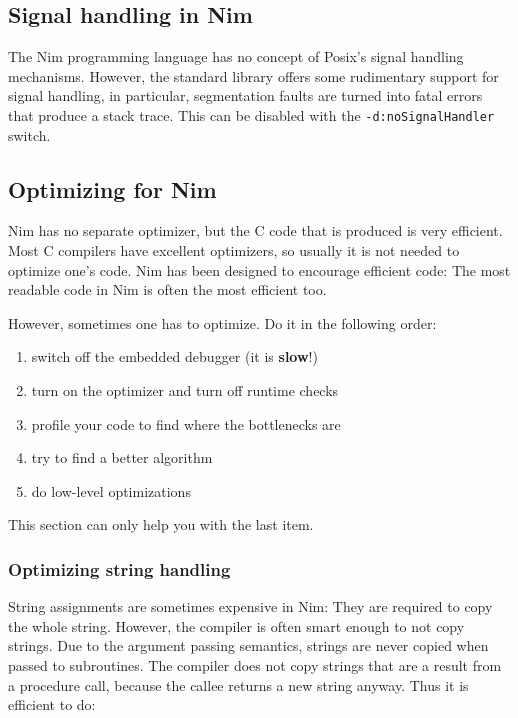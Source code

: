 \hypertarget{signal-handling-in-nim}{%
\subsection{Signal handling in Nim}\label{signal-handling-in-nim}}

The Nim programming language has no concept of Posix's signal handling
mechanisms. However, the standard library offers some rudimentary
support for signal handling, in particular, segmentation faults are
turned into fatal errors that produce a stack trace. This can be
disabled with the \texttt{-d:noSignalHandler} switch.

\hypertarget{optimizing-for-nim}{%
\subsection{Optimizing for Nim}\label{optimizing-for-nim}}

Nim has no separate optimizer, but the C code that is produced is very
efficient. Most C compilers have excellent optimizers, so usually it is
not needed to optimize one's code. Nim has been designed to encourage
efficient code: The most readable code in Nim is often the most
efficient too.

However, sometimes one has to optimize. Do it in the following order:

\begin{enumerate}
\def\labelenumi{\arabic{enumi}.}
\tightlist
\item
  switch off the embedded debugger (it is \textbf{slow}!)
\item
  turn on the optimizer and turn off runtime checks
\item
  profile your code to find where the bottlenecks are
\item
  try to find a better algorithm
\item
  do low-level optimizations
\end{enumerate}

This section can only help you with the last item.

\hypertarget{optimizing-string-handling}{%
\subsubsection{Optimizing string
handling}\label{optimizing-string-handling}}

String assignments are sometimes expensive in Nim: They are required to
copy the whole string. However, the compiler is often smart enough to
not copy strings. Due to the argument passing semantics, strings are
never copied when passed to subroutines. The compiler does not copy
strings that are a result from a procedure call, because the callee
returns a new string anyway. Thus it is efficient to do:

